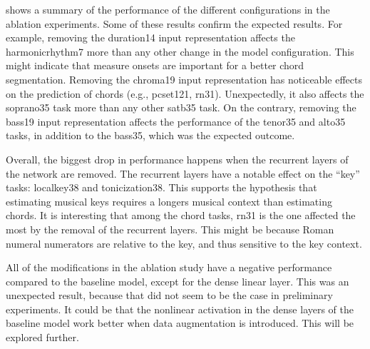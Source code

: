 

 shows a summary of the performance of the
different configurations in the ablation experiments. Some
of these results confirm the expected results. For example,
removing the \gls{duration14} input representation affects
the \gls{harmonicrhythm7} more than any other change in the
model configuration. This might indicate that measure onsets
are important for a better chord segmentation. Removing the
\gls{chroma19} input representation has noticeable effects
on the prediction of chords (e.g., \gls{pcset121},
\gls{rn31}). Unexpectedly, it also affects the
\gls{soprano35} task more than any other \gls{satb35} task.
On the contrary, removing the \gls{bass19} input
representation affects the performance of the \gls{tenor35}
and \gls{alto35} tasks, in addition to the \gls{bass35},
which was the expected outcome.

Overall, the biggest drop in performance happens when the
recurrent layers of the network are removed. The recurrent
layers have a notable effect on the ``key'' tasks:
\gls{localkey38} and \gls{tonicization38}. This supports the
hypothesis that estimating musical keys requires a longers
musical context than estimating chords. It is interesting
that among the chord tasks, \gls{rn31} is the one affected
the most by the removal of the recurrent layers. This might
be because Roman numeral numerators are relative to the key,
and thus sensitive to the key context.

All of the modifications in the ablation study have a
negative performance compared to the baseline model, except
for the dense linear layer. This was an unexpected result,
because that did not seem to be the case in preliminary
experiments. It could be that the nonlinear activation in
the dense layers of the baseline model work better when data
augmentation is introduced. This will be explored further.
